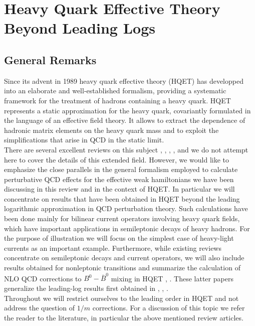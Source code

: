 \section{Heavy Quark Effective Theory Beyond Leading Logs}
\label{sec:HQET}

\subsection{General Remarks}
\label{sec:HQET:General}

Since its advent in 1989 heavy quark effective theory (HQET) has
developped into an elaborate and well-established formalism, providing a
systematic framework for the treatment of hadrons containing a heavy quark.
HQET represents a static approximation for
the heavy quark, covariantly formulated in the language of an effective
field theory.
It allows to extract the dependence of hadronic matrix elements on the
heavy quark mass and to exploit the simplifications that arise in QCD in
the static limit.
\\
There are several excellent reviews on this subject \cite{neubert:94},
\cite{georgi:91}, \cite{grinstein:91}, \cite{isgurwise:92},
\cite{mannel:93} and we do not attempt here to cover the details of
this extended field. However, we would like to emphasize the close
parallels in the general formalism employed to calculate perturbative
QCD effects for the effective weak hamiltonians we have been discussing
in this review and in the context of HQET. In particular we will
concentrate on results that have been obtained in HQET beyond the
leading logarithmic approximation in QCD perturbation theory. Such
calculations have been done mainly for bilinear current operators
involving heavy quark fields, which have important applications in
semileptonic decays of heavy hadrons.  For the purpose of illustration
we will focus on the simplest case of heavy-light currents as an
important example.  Furthermore, while existing reviews concentrate on
semileptonic decays and current operators, we will also include results
obtained for nonleptonic transitions and summarize the calculation of
NLO QCD corrections to $B^0-\bar B^0$ mixing in HQET \cite{flynnetal:91},
\cite{gimenez:93}. These latter papers generalize the leading-log
results first obtained in \cite{voloshinshifman:87}, \cite{politzerwise:88a},
\cite{politzerwise:88b}.
\\
Throughout we will restrict ourselves to the leading order in HQET and
not address the question of $1/m$ corrections. For a discussion of this
topic we refer the reader to the literature, in particular the above
mentioned review articles.

